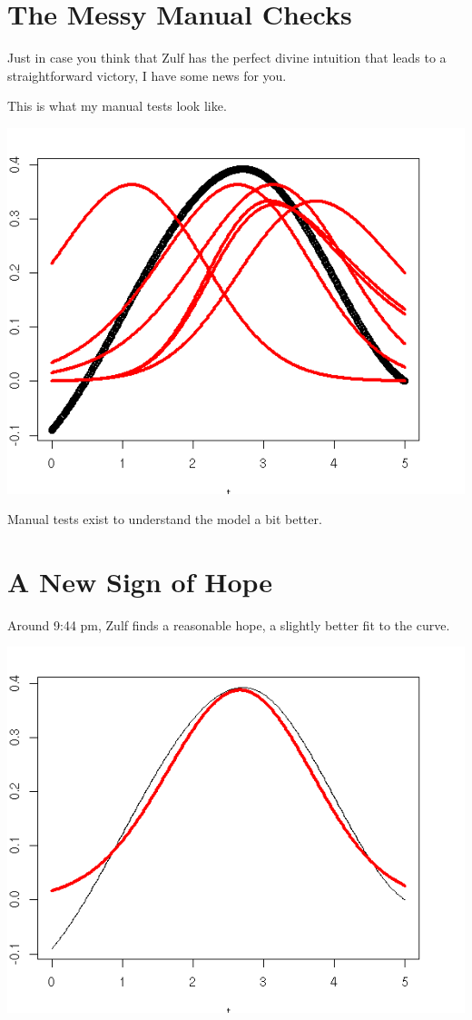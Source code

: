 \documentclass{amsart}
\begin{document}
\section{The Messy Manual Checks}

Just in case you think that Zulf has the perfect divine intuition that leads to a straightforward victory, I have some news for you.

This is what my manual tests look like.

\includegraphics[scale=0.8]{manual_tests.png}

Manual tests exist to understand the 
model a bit better.

\section{A New Sign of Hope}

Around 9:44 pm, Zulf finds a reasonable hope, a slightly better fit to the curve.

\includegraphics[scale=0.8]{betterfit_may15_2021.png}
\end{document}
